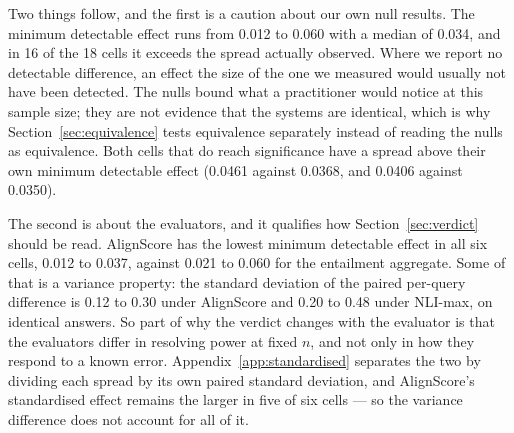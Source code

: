 \documentclass[11pt]{article}
\begin{document}
Two things follow, and the first is a caution about our own null results. The minimum detectable effect runs from 0.012 to 0.060 with a median of 0.034, and in 16 of the 18 cells it exceeds the spread actually observed. Where we report no detectable difference, an effect the size of the one we measured would usually not have been detected. The nulls bound what a practitioner would notice at this sample size; they are not evidence that the systems are identical, which is why Section~\ref{sec:equivalence} tests equivalence separately instead of reading the nulls as equivalence. Both cells that do reach significance have a spread above their own minimum detectable effect (0.0461 against 0.0368, and 0.0406 against 0.0350).

The second is about the evaluators, and it qualifies how Section~\ref{sec:verdict} should be read. AlignScore has the lowest minimum detectable effect in all six cells, 0.012 to 0.037, against 0.021 to 0.060 for the entailment aggregate. Some of that is a variance property: the standard deviation of the paired per-query difference is 0.12 to 0.30 under AlignScore and 0.20 to 0.48 under NLI-max, on identical answers. So part of why the verdict changes with the evaluator is that the evaluators differ in resolving power at fixed $n$, and not only in how they respond to a known error. Appendix~\ref{app:standardised} separates the two by dividing each spread by its own paired standard deviation, and AlignScore's standardised effect remains the larger in five of six cells --- so the variance difference does not account for all of it.
\end{document}

